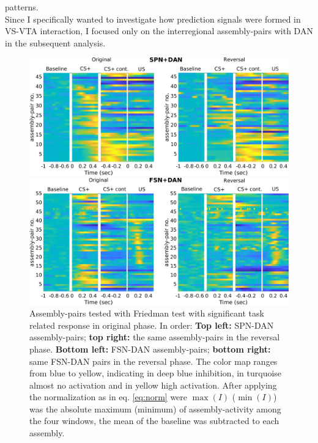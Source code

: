 patterns.\\Since I specifically wanted to investigate how prediction signals were formed in VS-VTA interaction, I focused only on the interregional assembly-pairs with DAN in the subsequent analysis.\\
 \begin{figure}
     \centering
     \includegraphics[scale=0.32]{figures/SPN_DAN.pdf}
     
     \vspace{1cm}
     
     \includegraphics[scale=0.32]{figures/HeatFSN_DAN.pdf}
     \caption{Assembly-pairs tested with Friedman test with significant task related response in original phase. In order: \textbf{Top left:} SPN-DAN assembly-pairs; \textbf{top right:} the same assembly-pairs in the reversal phase. \textbf{Bottom left:} FSN-DAN assembly-pairs; \textbf{bottom right:} same FSN-DAN pairs in the reversal phase. The color map ranges from blue to yellow, indicating in deep blue inhibition, in turquoise almost no activation and in yellow high activation. After applying the normalization as in eq. \ref{eq:norm} were $\max(I)$ ($\min(I)$) was the absolute maximum (minimum) of assembly-activity among the four windows, the mean of the baseline was subtracted to each assembly.}
     \label{fig:HeatPairsDan}
 \end{figure}
